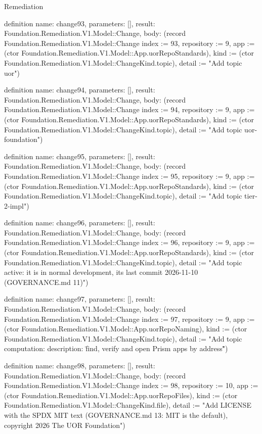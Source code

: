 \begin{lexlean}{Remediation}
\begin{semanticmodule}
definition{
  name: change93,
  parameters: [],
  result: Foundation.Remediation.V1.Model::Change,
  body: (record Foundation.Remediation.V1.Model::Change {index := 93, repository := 9, app := (ctor Foundation.Remediation.V1.Model::App.uorRepoStandards), kind := (ctor Foundation.Remediation.V1.Model::ChangeKind.topic), detail := "Add topic uor"})
}

definition{
  name: change94,
  parameters: [],
  result: Foundation.Remediation.V1.Model::Change,
  body: (record Foundation.Remediation.V1.Model::Change {index := 94, repository := 9, app := (ctor Foundation.Remediation.V1.Model::App.uorRepoStandards), kind := (ctor Foundation.Remediation.V1.Model::ChangeKind.topic), detail := "Add topic uor-foundation"})
}

definition{
  name: change95,
  parameters: [],
  result: Foundation.Remediation.V1.Model::Change,
  body: (record Foundation.Remediation.V1.Model::Change {index := 95, repository := 9, app := (ctor Foundation.Remediation.V1.Model::App.uorRepoStandards), kind := (ctor Foundation.Remediation.V1.Model::ChangeKind.topic), detail := "Add topic tier-2-impl"})
}

definition{
  name: change96,
  parameters: [],
  result: Foundation.Remediation.V1.Model::Change,
  body: (record Foundation.Remediation.V1.Model::Change {index := 96, repository := 9, app := (ctor Foundation.Remediation.V1.Model::App.uorRepoStandards), kind := (ctor Foundation.Remediation.V1.Model::ChangeKind.topic), detail := "Add topic active: it is in normal development, its last commit 2026-11-10 (GOVERNANCE.md 11)"})
}

definition{
  name: change97,
  parameters: [],
  result: Foundation.Remediation.V1.Model::Change,
  body: (record Foundation.Remediation.V1.Model::Change {index := 97, repository := 9, app := (ctor Foundation.Remediation.V1.Model::App.uorRepoNaming), kind := (ctor Foundation.Remediation.V1.Model::ChangeKind.topic), detail := "Add topic computation: description: \"find, verify and open Prism apps by address\""})
}

definition{
  name: change98,
  parameters: [],
  result: Foundation.Remediation.V1.Model::Change,
  body: (record Foundation.Remediation.V1.Model::Change {index := 98, repository := 10, app := (ctor Foundation.Remediation.V1.Model::App.uorRepoFiles), kind := (ctor Foundation.Remediation.V1.Model::ChangeKind.file), detail := "Add LICENSE with the SPDX MIT text (GOVERNANCE.md 13: MIT is the default), copyright 2026 The UOR Foundation"})
}


\end{semanticmodule}
\end{lexlean}
